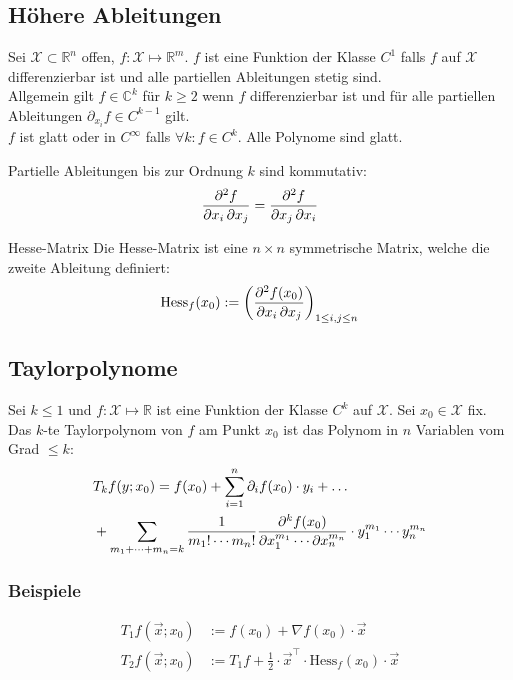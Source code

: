 \documentclass[a4paper,10pt]{article}
\def\R{\mathbb{R}}
\def\C{\mathbb{C}}
\def\X{\mathcal{X}}
\begin{document}
\subsection{Höhere Ableitungen}
Sei \(\X \subset \R^n\) offen, \(f: \X \mapsto \R^m\). \(f\) ist eine Funktion der Klasse \(C^1\) falls \(f\) auf \(\X\) differenzierbar ist und alle partiellen Ableitungen stetig sind. \\
Allgemein gilt \(f \in \C^k\) für \(k \ge 2\) wenn \(f\) differenzierbar ist und für alle partiellen Ableitungen \(\partial_{x_i} f \in C^{k-1}\) gilt. \\
\(f\) ist glatt oder in \(C^\infty\) falls \(\forall k: f \in C^k \). Alle Polynome sind glatt.

Partielle Ableitungen bis zur Ordnung \(k\) sind kommutativ:
$$\pdv{f}{x_i, x_j} = \pdv{f}{ x_j, x_i}$$

\begin{mainbox}{Hesse-Matrix}
  Die Hesse-Matrix ist eine \(n \times n\) symmetrische Matrix, welche die zweite Ableitung definiert:
  \[\text{Hess}_f(x_0) := \left(\pdv{f(x_0)}{x_i, x_j}\right)_{1\le i,j \le n}\] 
\end{mainbox}
\subsection{Taylorpolynome}
Sei \(k \le 1\) und \(f: \X \mapsto \R\) ist eine Funktion der Klasse \(C^k\) auf \(\X\). Sei \(x_0 \in \X\) fix. Das \(k\)-te Taylorpolynom von \(f\) am Punkt \(x_0\) ist das Polynom in \(n\) Variablen vom Grad \(\le k\):
\begin{align*}
  &T_k f(y; x_0) = f(x_0) + \sum_{i=1}^n \partial_i f(x_0) \cdot y_i + \dots \\
  &+ \sum_{m_1 + \cdots + m_n = k} \frac{1}{m_1! \cdots m_n!} \pdv{^k f(x_0) }{x_1^{m_1} \cdots \partial x_n^{m_n}} \cdot y_1^{m_1} \cdots y_n^{m_n}
\end{align*}

\subsubsection*{Beispiele}
\begin{align*}
  T_1 f(\vec{x}; x_0) &:= f(x_0) + \nabla f(x_0) \cdot \vec{x} \\
  T_2 f(\vec{x}; x_0) &:= T_1f + \frac{1}{2} \cdot \vec{x}^\top \cdot \text{Hess}_f(x_0) \cdot \vec{x}
\end{align*}
\end{document}
